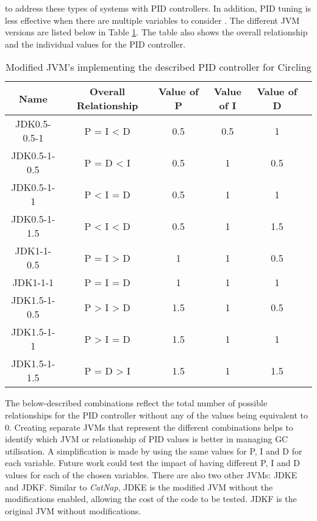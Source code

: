 to address these types of systems with PID controllers. In addition, PID
tuning is less effective when there are multiple variables to consider
\cite{he2000pi}.
\newline\newline
The different JVM versions are listed below in Table \ref{table:jvm-circling}. The table also
shows the overall relationship and the individual values for the PID
controller. 
\begin{table} [H]
\caption{Modified JVM's implementing the described PID controller for
Circling}

\begin{tabular}[H]{|c|c|c|c|c|c|}
\hline
Name & Overall Relationship & Value of P & Value of I & Value of
D\tabularnewline
\hline
JDK0.5-0.5-1 & P = I \textless{} D & 0.5 & 0.5 & 1\tabularnewline \hline

JDK0.5-1-0.5 & P = D \textless{} I & 0.5 & 1 & 0.5\tabularnewline \hline

JDK0.5-1-1 & P \textless{} I = D & 0.5 & 1 & 1\tabularnewline \hline

JDK0.5-1-1.5 & P \textless{} I \textless{} D & 0.5 & 1 &
1.5\tabularnewline \hline

JDK1-1-0.5 & P = I \textgreater{} D & 1 & 1 & 0.5\tabularnewline \hline

JDK1-1-1 & P = I = D & 1 & 1 & 1\tabularnewline \hline

JDK1.5-1-0.5 & P \textgreater{} I \textgreater{} D & 1.5 & 1 &
0.5\tabularnewline \hline

JDK1.5-1-1 & P \textgreater{} I = D & 1.5 & 1 & 1\tabularnewline \hline

JDK1.5-1-1.5 & P = D \textgreater{} I & 1.5 & 1 & 1.5\tabularnewline \hline
\end{tabular}
\label{table:jvm-circling}
\end{table}
\newline\newline
The below-described combinations reflect the total number of possible
relationships for the PID controller without any of the values being
equivalent to 0. Creating separate JVMs that represent the different
combinations helps to identify which JVM or relationship of PID values
is better in managing GC utilisation. A simplification is made by using
the same values for P, I and D for each variable. Future work could test
the impact of having different P, I and D values for each of the chosen
variables.
\newline\newline
There are also two other JVMs: JDKE and JDKF. Similar to \emph{CatNap}, JDKE is
the modified JVM without the modifications enabled, allowing the cost of
the code to be tested. JDKF is the original JVM without modifications.

